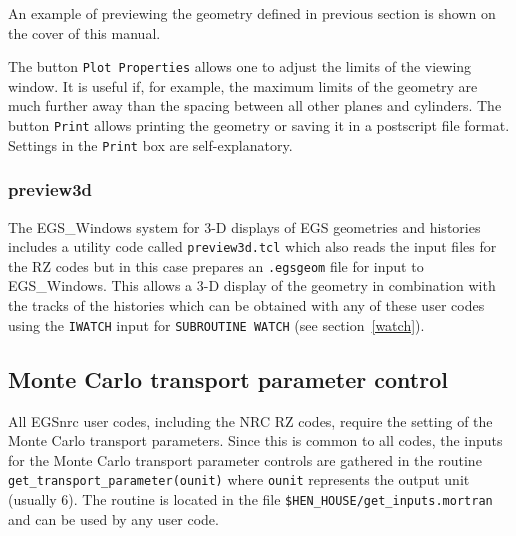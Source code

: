 \documentclass[12pt,twoside]{article}  %
\begin{document}
An example of previewing the geometry defined in previous
section is shown on the cover of this manual.

\noindent
The button \verb+Plot Properties+ allows one to adjust the
limits of the viewing window. It  is useful if, for example,
the maximum limits of the geometry are much further away than
the spacing between all other planes and cylinders.
The button \verb+Print+ allows printing the geometry or saving it in a
postscript file format. Settings
in the \verb+Print+ box are self-explanatory.


\subsubsection{preview3d}

 
 
The EGS\_Windows system for 3-D displays of EGS geometries and
histories\cite{TR99a} includes a utility code called {\tt preview3d.tcl}
which also reads the input files for the RZ codes but in this case prepares
an {\tt .egsgeom} file for input to EGS\_Windows. This allows a 3-D display
of the geometry in combination with the tracks of the histories which can
be obtained with any of these user codes using the {\tt IWATCH} input for
{\tt SUBROUTINE WATCH} (see section~\ref{watch}).



\subsection{Monte Carlo transport parameter control}
\label{mctpsect}


All EGSnrc user codes, including the NRC RZ codes, require
the setting of the Monte Carlo transport parameters. Since this
is common to all codes, the inputs for the Monte Carlo transport
parameter controls are gathered in the routine
\verb+get_transport_parameter(ounit)+ where \verb+ounit+ represents
the output unit (usually 6). The routine is located in the
file \verb+$HEN_HOUSE/get_inputs.mortran+ and can be used by any user code.
\end{document}
